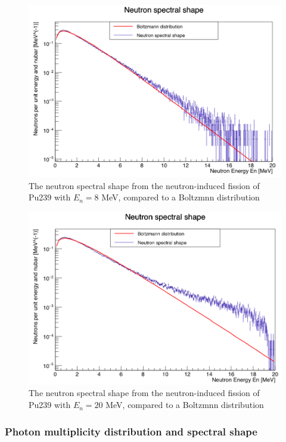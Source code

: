 \documentclass[]{article}
\begin{document}
\begin{figure} [H]
	\centering
	\includegraphics[scale=0.36]{Pu239_8_n_spectral_shape.png}
	\caption{The neutron spectral shape from the neutron-induced fission of Pu239 with $E_n = 8$ MeV, compared to a Boltzmnn distribution}
	\label{fig:Pu239_8_n_spectral_shape}
\end{figure}

\begin{figure} [H]
	\centering
	\includegraphics[scale=0.36]{Pu239_20_n_spectral_shape.png}
	\caption{The neutron spectral shape from the neutron-induced fission of Pu239 with $E_n = 20$ MeV, compared to a Boltzmnn distribution}
	\label{fig:Pu239_20_n_spectral_shape}
\end{figure}

\subsubsection{Photon multiplicity distribution and spectral shape}
\end{document}
